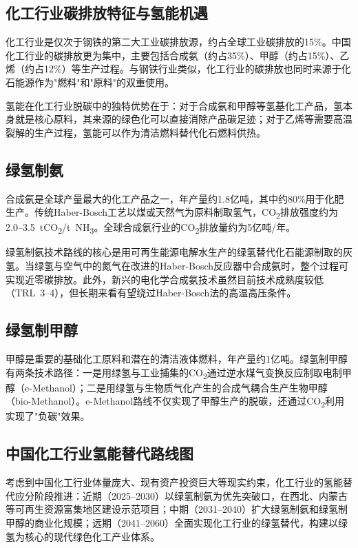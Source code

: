 \documentclass[12pt,a4paper]{ctexart}
\newcommand{\COO}{CO\textsubscript{2}}
\begin{document}
\subsection{化工行业碳排放特征与氢能机遇}

化工行业是仅次于钢铁的第二大工业碳排放源，约占全球工业碳排放的15\%\cite{zhao2021}。中国化工行业的碳排放更为集中，主要包括合成氨（约占35\%）、甲醇（约占15\%）、乙烯（约占12\%）等生产过程。与钢铁行业类似，化工行业的碳排放也同时来源于化石能源作为"燃料"和"原料"的双重使用。

氢能在化工行业脱碳中的独特优势在于：对于合成氨和甲醇等氢基化工产品，氢本身就是核心原料，其来源的绿色化可以直接消除产品碳足迹；对于乙烯等需要高温裂解的生产过程，氢能可以作为清洁燃料替代化石燃料供热。

\subsection{绿氢制氨}

合成氨是全球产量最大的化工产品之一，年产量约1.8亿吨，其中约80\%用于化肥生产\cite{han2021}。传统Haber-Bosch工艺以煤或天然气为原料制取氢气，\COO 排放强度约为2.0--3.5~t\COO/t~NH\textsubscript{3}。全球合成氨行业的\COO 排放量约为5亿吨/年。

绿氢制氨技术路线的核心是用可再生能源电解水生产的绿氢替代化石能源制取的灰氢。当绿氢与空气中的氮气在改进的Haber-Bosch反应器中合成氨时，整个过程可实现近零碳排放。此外，新兴的电化学合成氨技术虽然目前技术成熟度较低（TRL~3--4），但长期来看有望绕过Haber-Bosch法的高温高压条件。

\subsection{绿氢制甲醇}

甲醇是重要的基础化工原料和潜在的清洁液体燃料，年产量约1亿吨。绿氢制甲醇有两条技术路径：一是用绿氢与工业捕集的\COO 通过逆水煤气变换反应制取电制甲醇（e-Methanol）；二是用绿氢与生物质气化产生的合成气耦合生产生物甲醇（bio-Methanol）。e-Methanol路线不仅实现了甲醇生产的脱碳，还通过\COO 利用实现了"负碳"效果。

\subsection{中国化工行业氢能替代路线图}

考虑到中国化工行业体量庞大、现有资产投资巨大等现实约束，化工行业的氢能替代应分阶段推进：近期（2025--2030）以绿氢制氨为优先突破口，在西北、内蒙古等可再生资源富集地区建设示范项目；中期（2031--2040）扩大绿氢制氨和绿氢制甲醇的商业化规模；远期（2041--2060）全面实现化工行业的绿氢替代，构建以绿氢为核心的现代绿色化工产业体系。
\end{document}

